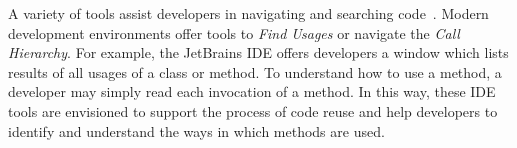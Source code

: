 \documentclass[conference]{IEEEtran}
\begin{document}
A variety of tools assist developers in navigating and searching code~\cite{augustine2015field,ko2006exploratory,albusays2017interviews}. Modern development environments offer tools to \textit{Find Usages} or navigate the \textit{Call Hierarchy}. For example, the JetBrains IDE offers developers a window which lists results of all usages of a class or method. To understand how to use a method, a developer may simply read each invocation of a method. In this way, these IDE tools are envisioned to support the process of code reuse and help developers to identify and understand the ways in which methods are used.









\end{document}
